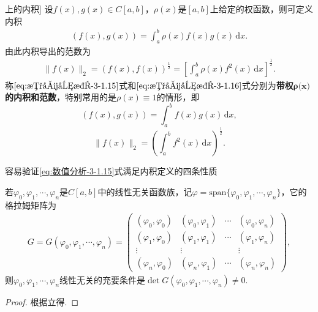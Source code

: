 \documentclass[../../main.tex]{subfiles}
\begin{document}
\begin{definition}[\( C[a,b] \)上的内积]
设\( f(x),g(x) \in C[a,b] \)，\(\rho(x)\)是\([a,b]\)上给定的权函数，则可定义内积
\begin{align}
(f(x),g(x)) = \int_a^b \rho(x) f(x) g(x) \, \mathrm{d}x. \label{eq:数值分析-3-1.15}
\end{align}
由此内积导出的范数为
\begin{align}
\| f(x) \|_2 = (f(x),f(x))^{\frac{1}{2}} = \left[ \int_a^b \rho(x) f^2(x) \, \mathrm{d}x \right]^{\frac{1}{2}}. \label{eq:数值分析-3-1.16}
\end{align}
称\(\eqref{eq:数值分析-3-1.15}\)式和\(\eqref{eq:数值分析-3-1.16}\)式分别为\textbf{带权\(\boldsymbol{\rho }\mathbf{(}\boldsymbol{x}\mathbf{)}\)的内积和范数}，特别常用的是\(\rho(x) \equiv 1\)的情形，即
\[
(f(x),g(x)) = \int_a^b f(x) g(x) \, \mathrm{d}x,
\]
\[
\| f(x) \|_2 = \left( \int_a^b f^2(x) \, \mathrm{d}x \right)^{\frac{1}{2}}.
\]
\end{definition}
\begin{remark}
容易验证\eqref{eq:数值分析-3-1.15}式满足内积定义的四条性质
\end{remark}

\begin{example}

若\(\varphi_0, \varphi_1, \cdots, \varphi_n\)是\(C[a,b]\)中的线性无关函数族，记\(\varphi = \text{span}\{\varphi_0, \varphi_1, \cdots, \varphi_n\}\)，它的格拉姆矩阵为
\begin{align}
G = G(\varphi_0, \varphi_1, \cdots, \varphi_n) = \begin{pmatrix}
(\varphi_0, \varphi_0) & (\varphi_0, \varphi_1) & \cdots & (\varphi_0, \varphi_n) \\
(\varphi_1, \varphi_0) & (\varphi_1, \varphi_1) & \cdots & (\varphi_1, \varphi_n) \\
\vdots & \vdots & & \vdots \\
(\varphi_n, \varphi_0) & (\varphi_n, \varphi_1) & \cdots & (\varphi_n, \varphi_n)
\end{pmatrix}, \label{eq:数值分析-3-1.17}
\end{align}
则\(\varphi_0, \varphi_1, \cdots, \varphi_n\)线性无关的充要条件是\(\det G(\varphi_0, \varphi_1, \cdots, \varphi_n) \neq 0\).
\end{example}
\begin{proof}
根据立得.

\end{proof}
\end{document}
